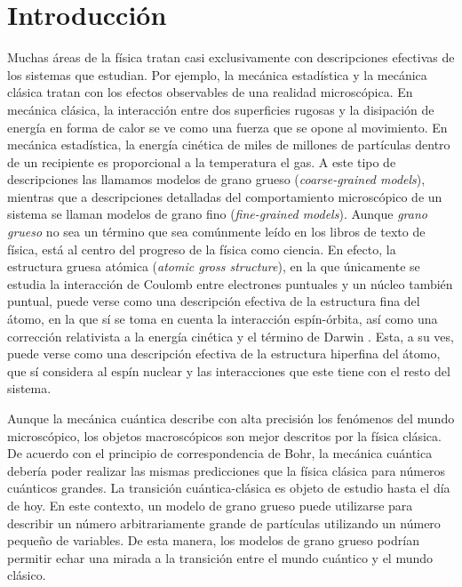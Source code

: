 \chapter{Introducción}



Muchas áreas de la física tratan casi exclusivamente con descripciones efectivas de los sistemas que estudian. Por ejemplo, la mecánica estadística y la mecánica clásica tratan con los efectos observables de una realidad microscópica. En mecánica clásica, la interacción entre dos superficies rugosas y la disipación de energía en forma de calor se ve como una fuerza que se opone al movimiento. En mecánica estadística, la energía cinética de miles de millones de partículas dentro de un recipiente es proporcional a la temperatura el gas. A este tipo de descripciones las llamamos modelos de grano grueso (\textit{coarse-grained models}), mientras que a descripciones detalladas del comportamiento microscópico de un sistema se llaman modelos de grano fino (\textit{fine-grained models}). Aunque \textit{grano grueso} no sea un término que sea comúnmente leído en los libros de texto de física, está al centro del progreso de la física como ciencia. En efecto, la estructura gruesa atómica (\textit{atomic gross structure}), en la que únicamente se estudia la interacción de Coulomb entre electrones puntuales y un núcleo también puntual, puede verse como una descripción efectiva de la estructura fina del átomo, en la que sí se toma en cuenta la interacción espín-órbita, así como una corrección relativista a la energía cinética y el término de Darwin  \cite{Bransden}. Esta, a su ves, puede verse como una descripción efectiva de la estructura hiperfina del átomo, que sí considera al espín nuclear y las interacciones que este tiene con el resto del sistema.


Aunque la mecánica cuántica describe con alta precisión los fenómenos del mundo microscópico, los objetos macroscópicos son mejor descritos por la física clásica. De acuerdo con el principio de correspondencia de Bohr, la mecánica cuántica debería poder realizar las mismas predicciones que la física clásica para números cuánticos grandes. La transición cuántica-clásica es objeto de estudio hasta el día de hoy. En este contexto, un modelo de grano grueso puede utilizarse para describir un número arbitrariamente grande de partículas utilizando un número pequeño de variables. De esta manera, los modelos de grano grueso podrían permitir echar una mirada a la transición entre el mundo cuántico y el mundo clásico.

